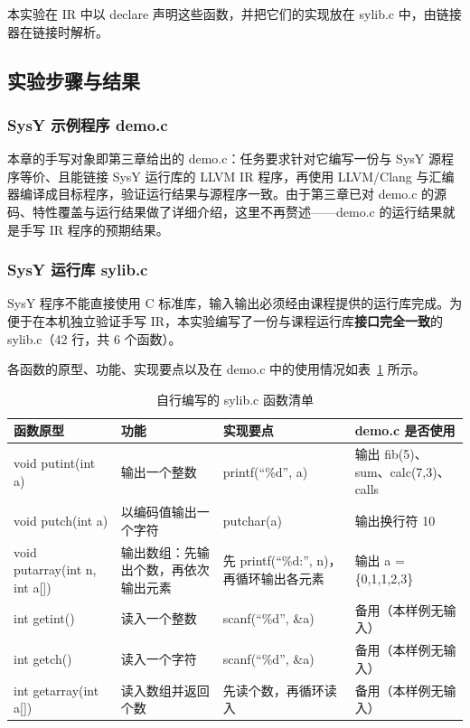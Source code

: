 \documentclass[UTF8,a4paper,10pt]{ctexart}
\newcommand{\headcol}{\bfseries}
\newcommand{\hfour}[1]{\par\vspace{0.55em}\noindent{\bfseries #1}\par\vspace{0.25em}}
\begin{document}
本实验在 IR 中以 declare 声明这些函数，并把它们的实现放在 sylib.c 中，由链接器在链接时解析。

\subsection{实验步骤与结果}

\subsubsection{SysY 示例程序 demo.c}

本章的手写对象即第三章给出的 demo.c：任务要求针对它编写一份与 SysY 源程序等价、且能链接 SysY 运行库的 LLVM IR 程序，再使用 LLVM/Clang 与汇编器编译成目标程序，验证运行结果与源程序一致。由于第三章已对 demo.c 的源码、特性覆盖与运行结果做了详细介绍，这里不再赘述——demo.c 的运行结果就是手写 IR 程序的预期结果。

\subsubsection{SysY 运行库 sylib.c}

SysY 程序不能直接使用 C 标准库，输入输出必须经由课程提供的运行库完成。为便于在本机独立验证手写 IR，本实验编写了一份与课程运行库\textbf{接口完全一致}的 sylib.c（42 行，共 6 个函数）。

\hfour{1、函数清单与接口}

各函数的原型、功能、实现要点以及在 demo.c 中的使用情况如表~\ref{tab:sylibfull} 所示。

\begin{table}[H]
  \centering
  \small
  \setlength{\tabcolsep}{4pt}
  \begin{tabular}{>{\centering\arraybackslash}p{3.2cm}>{\centering\arraybackslash}p{2.6cm}>{\centering\arraybackslash}p{3.2cm}>{\centering\arraybackslash}p{5.0cm}}
    \toprule
\headcol 函数原型 & \headcol 功能 & \headcol 实现要点 & \headcol demo.c 是否使用 \\
    \midrule
void putint(int a) & 输出一个整数 & printf(“\%d”, a) & 输出 fib(5)、sum、calc(7,3)、calls \\
    void putch(int a) & 以编码值输出一个字符 & putchar(a) & 输出换行符 10 \\
    void putarray(int n, int a[]) & 输出数组：先输出个数，再依次输出元素 & 先 printf(“\%d:”, n)，再循环输出各元素 & 输出 a = \{0,1,1,2,3\} \\
    int getint() & 读入一个整数 & scanf(“\%d”, \&a) & 备用（本样例无输入） \\
    int getch() & 读入一个字符 & scanf(“\%d”, \&a) & 备用（本样例无输入） \\
    int getarray(int a[]) & 读入数组并返回个数 & 先读个数，再循环读入 & 备用（本样例无输入） \\
    \bottomrule
\end{tabular}
  \caption{自行编写的 sylib.c 函数清单}
  \label{tab:sylibfull}
\end{table}
\end{document}
